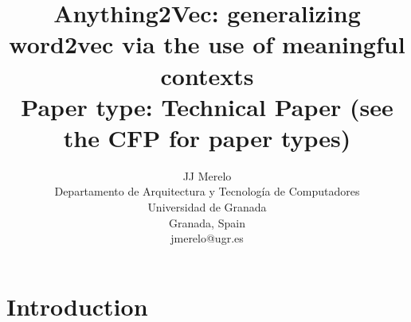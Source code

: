 \documentclass[letterpaper]{article}
\title{Anything2Vec: generalizing word2vec via the use of meaningful contexts \\
Paper type: Technical Paper (see the CFP for paper types)}
\author{ %
  JJ Merelo\\
Departamento de Arquitectura y Tecnología de Computadores\\
Universidad de Granada\\
Granada, Spain\\
jmerelo@ugr.es\\
}
\begin{document}
 
\maketitle
\begin{abstract}

\end{abstract}

\section{Introduction}




\end{document}
